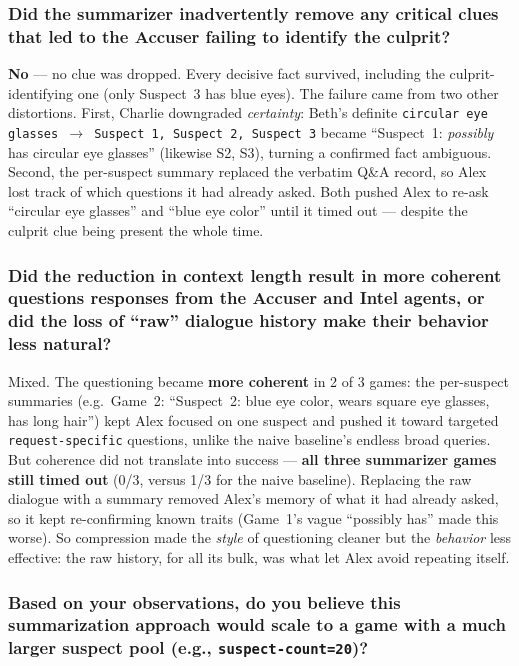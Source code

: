\documentclass{article}
\begin{document}
\subsubsection*{Did the summarizer inadvertently remove any critical clues that led to the
Accuser failing to identify the culprit?}

\textbf{No} --- no clue was dropped. Every decisive fact survived, including the
culprit-identifying one (only Suspect~3 has blue eyes). The failure came from two other
distortions. First, Charlie downgraded \emph{certainty}: Beth's definite
\texttt{circular eye glasses $\rightarrow$ Suspect 1, Suspect 2, Suspect 3} became
``Suspect~1: \emph{possibly} has circular eye glasses'' (likewise S2, S3), turning a
confirmed fact ambiguous. Second, the per-suspect summary replaced the verbatim Q\&A record,
so Alex lost track of which questions it had already asked. Both pushed Alex to re-ask
``circular eye glasses'' and ``blue eye color'' until it timed out --- despite the culprit
clue being present the whole time.

\subsubsection*{Did the reduction in context length result in more coherent questions responses
from the Accuser and Intel agents, or did the loss of ``raw'' dialogue history make their
behavior less natural?}

Mixed. The questioning became \textbf{more coherent} in 2 of 3 games: the per-suspect
summaries (e.g.\ Game~2: ``Suspect~2: blue eye color, wears square eye glasses, has long
hair'') kept Alex focused on one suspect and pushed it toward targeted
\texttt{request-specific} questions, unlike the naive baseline's endless broad queries. But
coherence did not translate into success --- \textbf{all three summarizer games still timed
out} (0/3, versus 1/3 for the naive baseline). Replacing the raw dialogue with a summary
removed Alex's memory of what it had already asked, so it kept re-confirming known traits
(Game~1's vague ``possibly has'' made this worse). So compression made the \emph{style} of
questioning cleaner but the \emph{behavior} less effective: the raw history, for all its
bulk, was what let Alex avoid repeating itself.

\subsubsection*{Based on your observations, do you believe this summarization approach would
scale to a game with a much larger suspect pool (e.g., \texttt{suspect-count=20})?}
\end{document}
